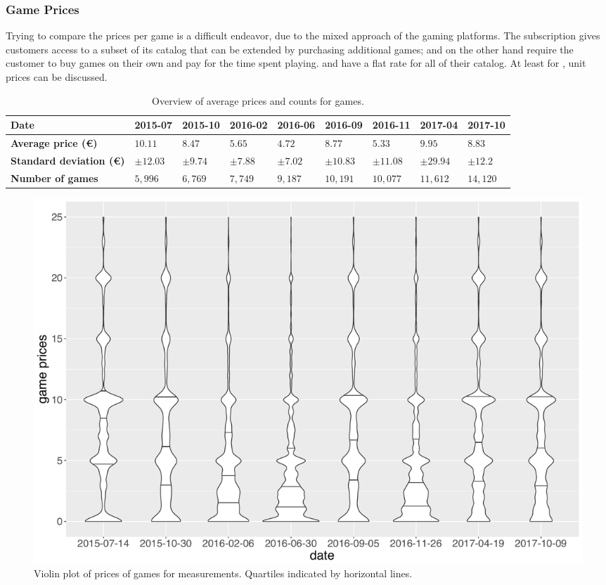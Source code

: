 \subsubsection{Game Prices}

Trying to compare the prices per game is a difficult endeavor, due to
the mixed approach of the gaming platforms. The \gfnow subscription
gives customers access to a subset of its catalog that can be
extended by purchasing additional games; \gfnowpc and \liquid
on the other hand require the customer to buy games on their
own and pay for the
time spent playing.
\psnow and \psnowpc have a flat rate for all of their catalog.
At least for \steam, unit prices can be discussed.

\begin{table}
\centering
\caption{Overview of average prices and counts for \steam games.}
\label{tab:steam-price-stats}
\begin{tabu}{X[2]|X[r]X[r]X[r]X[r]X[r]X[r]X[r]X[r]}
	\toprule
	\textbf{Date} & 2015-07 & 2015-10 & 2016-02 & 2016-06 & 2016-09 & 2016-11 & 2017-04 & 2017-10 \\
	\midrule
	\textbf{Average price (€)} & $10.11$ & $8.47$ & $5.65$ & $4.72$ & $8.77$ & $5.33$ & $9.95$ & $8.83$ \\
	\midrule
	\textbf{Standard deviation (€)} & $\pm12.03$ & $\pm9.74$ & $\pm7.88$ & $\pm7.02$ & $\pm10.83$ & $\pm11.08$ & $\pm29.94$ & $\pm12.2$ \\
	\midrule
	\textbf{Number of games} & $5,996$ & $6,769$ & $7,749$ & $9,187$ & $10,191$ & $10,077$ & $11,612$ & $14,120$ \\
	\bottomrule
\end{tabu}
\end{table}


\begin{figure}[!t]
	\centering
	\includegraphics[width=1.0\columnwidth]{images/steam-price-violins-over-time.pdf}
	\caption{Violin plot of prices of \steam games for measurements. Quartiles indicated by horizontal lines.}
\label{fig:steam-price-violins}
\end{figure}


